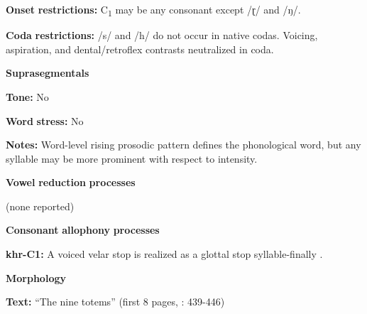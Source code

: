 \begin{styleBody}
\textbf{Onset} \textbf{restrictions:} C\textsubscript{1} may be any consonant except /ɽ/ and /ŋ/.
\end{styleBody}

\begin{styleBody}
\textbf{Coda} \textbf{restrictions:} /s/ and /h/ do not occur in native codas. Voicing, aspiration, and dental/retroflex contrasts neutralized in coda.
\end{styleBody}

\begin{styleBody}
\textbf{Suprasegmentals}
\end{styleBody}

\begin{styleBody}
\textbf{Tone:} No
\end{styleBody}

\begin{styleBody}
\textbf{Word} \textbf{stress:} No
\end{styleBody}

\begin{styleBody}
\textbf{Notes:} Word-level rising prosodic pattern defines the phonological word, but any syllable may be more prominent with respect to intensity.
\end{styleBody}

\begin{styleBody}
\textbf{Vowel} \textbf{reduction} \textbf{processes}
\end{styleBody}

\begin{styleBody}
(none reported)
\end{styleBody}

\begin{styleBody}
\textbf{Consonant} \textbf{allophony} \textbf{processes}
\end{styleBody}

\begin{styleBody}
\textbf{khr-C1:} A voiced velar stop is realized as a glottal stop syllable-finally \citep[29]{Peterson2011}.
\end{styleBody}

\begin{styleBody}
\textbf{Morphology}
\end{styleBody}

\begin{styleBody}
\textbf{Text:} “The nine totems” (first 8 pages, \citealt{Peterson2011}: 439-446)
\end{styleBody}

